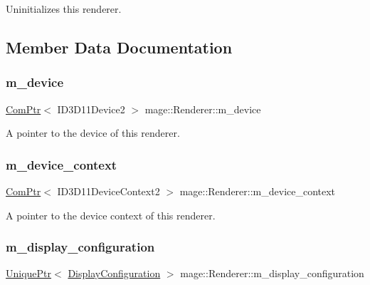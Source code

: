 Uninitializes this renderer. 

\subsection{Member Data Documentation}
\hypertarget{classmage_1_1_renderer_aecf4bcb70dc186b4f2083df38d1e4bc3}{}\label{classmage_1_1_renderer_aecf4bcb70dc186b4f2083df38d1e4bc3} 
\subsubsection{\texorpdfstring{m\+\_\+device}{m\_device}}
{\footnotesize\ttfamily \hyperlink{namespacemage_ae74f374780900893caa5555d1031fd79}{Com\+Ptr}$<$ I\+D3\+D11\+Device2 $>$ mage\+::\+Renderer\+::m\+\_\+device\hspace{0.3cm}{\ttfamily [private]}}

A pointer to the device of this renderer. \hypertarget{classmage_1_1_renderer_a47c4a1d46e84bbdc3ec876809633877e}{}\label{classmage_1_1_renderer_a47c4a1d46e84bbdc3ec876809633877e} 
\subsubsection{\texorpdfstring{m\+\_\+device\+\_\+context}{m\_device\_context}}
{\footnotesize\ttfamily \hyperlink{namespacemage_ae74f374780900893caa5555d1031fd79}{Com\+Ptr}$<$ I\+D3\+D11\+Device\+Context2 $>$ mage\+::\+Renderer\+::m\+\_\+device\+\_\+context\hspace{0.3cm}{\ttfamily [private]}}

A pointer to the device context of this renderer. \hypertarget{classmage_1_1_renderer_ab5638066fba5a0b9ce307f7db3ba5433}{}\label{classmage_1_1_renderer_ab5638066fba5a0b9ce307f7db3ba5433} 
\subsubsection{\texorpdfstring{m\+\_\+display\+\_\+configuration}{m\_display\_configuration}}
{\footnotesize\ttfamily \hyperlink{namespacemage_a3316d7143a973e37adf1110f2e80ca31}{Unique\+Ptr}$<$ \hyperlink{structmage_1_1_display_configuration}{Display\+Configuration} $>$ mage\+::\+Renderer\+::m\+\_\+display\+\_\+configuration\hspace{0.3cm}{\ttfamily [private]}}

